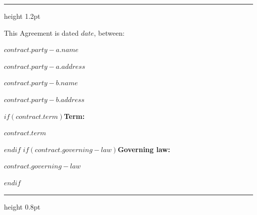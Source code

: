 {{{{{{{              {\color{obsidian}\hrule height 1.2pt}\par
              \vspace{0.5em}
              \noindent This Agreement is dated \textbf{$date$}, between:\par
              \vspace{0.8em}
              \begin{minipage}[t]{0.45\textwidth}
                \raggedright
                {\small\bfseries $contract.party-a.name$\par}%
                {\small $contract.party-a.address$\par}%
              \end{minipage}\hfill
              \begin{minipage}[t]{0.45\textwidth}
                \raggedright
                {\small\bfseries $contract.party-b.name$\par}%
                {\small $contract.party-b.address$\par}%
              \end{minipage}\par
              \vspace{0.8em}
              $if(contract.term)${\small\bfseries Term:} {\small $contract.term$\par}$endif$
              $if(contract.governing-law)${\small\bfseries Governing law:} {\small $contract.governing-law$\par}$endif$
              \vspace{0.5em}
              {\color{obsidian}\hrule height 0.8pt}\par
              \vspace{0.8em}
            }{%
              }}}}}}}
